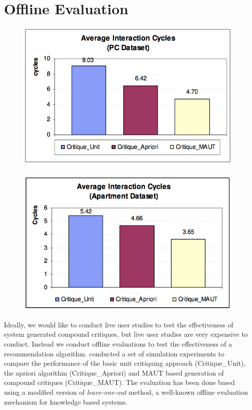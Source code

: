 \section{Offline Evaluation}
\label{sec:offline}
\begin{figure}
\centering
\begin{minipage}{.45\textwidth}
  \centering
  \includegraphics[width=1\linewidth]{figures-bharath/pc_results.png}
  \label{fig:pc_results}
\end{minipage}%
\;\;\;\;\;\;
\begin{minipage}{.45\textwidth}
  \centering
  \includegraphics[width=1\linewidth]{figures-bharath/apartment_results.png}
  \label{fig:apartment_results}
\end{minipage}
\end{figure}
Ideally, we would like to conduct live user studies to test the effectiveness of system generated compound critiques, but live user studies are very expensive to conduct.
Instead we conduct offline evaluations to test the effectiveness of a recommendation algorithm.
\cite{mautPaper} conducted a set of simulation experiments to compare the performance of the basic unit critiquing approach (Critique\_Unit), the apriori algorithm (Critique\_Apriori) and MAUT based generation of compound critiques (Critique\_MAUT).
The evaluation has been done based using a modified version of \textit{leave-one-out} method, a well-known offline evaluation mechanism for knowledge based systems.

